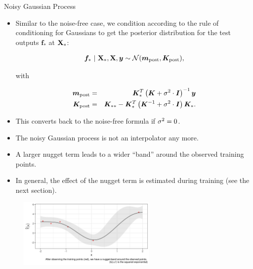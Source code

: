 \begin{frame}[c,allowframebreaks]{Noisy Gaussian Process}
\begin{itemize}
\item Similar to the noise-free case, we condition according to the rule of conditioning for Gaussians to get the posterior distribution for the test outputs $\bm{f}_*$ at $\mathbf{X}_*$:

\begin{eqnarray*}
\bm{f}_* ~|~ \mathbf{X}_*, \mathbf{X}, \bm{y} \sim \mathcal{N}(\bm{m}_{\text{post}}, \bm{K}_\text{post}),
\end{eqnarray*}

with 

\begin{eqnarray*}
\bm{m}_{\text{post}} &=& \Kmat_{*}^{T} \left(\Kmat+ \sigma^2 \cdot \id\right)^{-1}\bm{y} \\
\lz
\bm{K}_\text{post} &=& \Kmat_{**} - \Kmat_*^T \left(\Kmat ^{-1} + \sigma^2 \cdot \id\right)\Kmat_*.
\end{eqnarray*}

\end{itemize}

\begin{itemize}
\item[\faLightbulbO] This converts back to the noise-free formula if $\sigma^2 = 0$.
\end{itemize}

\framebreak

\begin{itemize}
\item The noisy Gaussian process is not an interpolator any more.
\item A larger nugget term leads to a wider ``band'' around the observed training points.
\item In general, the effect of the nugget term is estimated during training (see the next section).
\end{itemize}


\begin{figure}
\includegraphics[width=0.6\textwidth]{figure_man/gp-regression.png}
\end{figure}

\end{frame}
